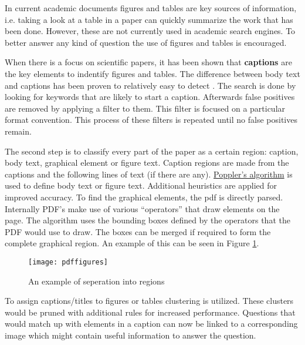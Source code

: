 In current academic documents figures and tables are key sources of information, i.e. taking a look at a table in a paper can quickly summarize the work that has been done.
However, these are not currently used in academic search engines.
To better answer any kind of question the use of figures and tables is encouraged.

When there is a focus on scientific papers, it has been shown that \textbf{captions} are the key elements to indentify figures and tables.
The difference between body text and captions has been proven to relatively easy to detect \cite{pdffigures2}.
The search is done by looking for keywords that are likely to start a caption.
Afterwards false positives are removed by applying a filter to them.
This filter is focused on a particular format convention.
This process of these filters is repeated until no false positives remain.

The second step is to classify every part of the paper as a certain region: caption, body text, graphical element or figure text.
Caption regions are made from the captions and the following lines of text (if there are any).
\href{https://poppler.freedesktop.org/}{Poppler's algorithm} is used to define body text or figure text.
Additional heuristics are applied for improved accuracy. 
To find the graphical elements, the pdf is directly parsed. 
Internally PDF's make use of various ``operators'' that draw elements on the page. 
The algorithm uses the bounding boxes defined by the operators that the PDF would use to draw.
The boxes can be merged if required to form the complete graphical region.
An example of this can be seen in Figure \ref{fig:pdffigure}.

\begin{figure}
\texttt{[image: pdffigures]}
\caption{An example of seperation into regions}\label{fig:pdffigure}
\end{figure}


To assign captions/titles to figures or tables clustering is utilized. 
These clusters would be pruned with additional rules for increased performance.
Questions that would match up with elements in a caption can now be linked to a corresponding image which might contain useful information to answer the question.

